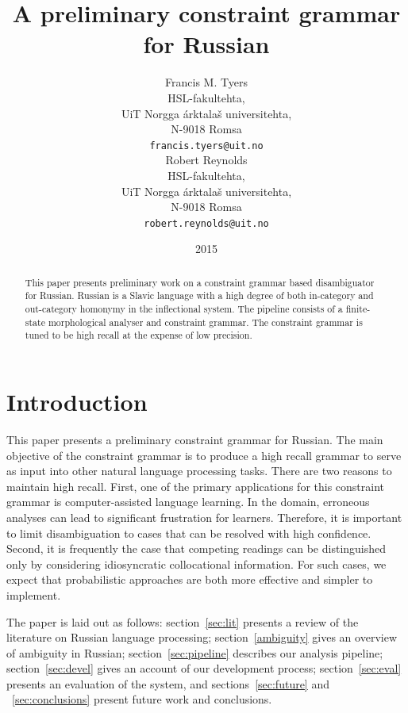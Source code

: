 \documentclass[11pt]{article}
\title{A preliminary constraint grammar for Russian}
\author{Francis M. Tyers \\
  HSL-fakultehta, \\
  UiT Norgga árktalaš universitehta, \\
  N-9018 Romsa \\
  {\tt francis.tyers@uit.no} \\\And
  Robert Reynolds \\
  HSL-fakultehta, \\
  UiT Norgga árktalaš universitehta, \\
  N-9018 Romsa \\
  {\tt robert.reynolds@uit.no} \\}
\date{2015}
\newcommand{\rr}[1]{\marginpar{\scriptsize R: #1}} %
\begin{document}
\maketitle
\begin{abstract}
 This paper presents preliminary work on a constraint
 grammar based disambiguator for Russian. Russian is
 a Slavic language with a high degree of both in-category
 and out-category homonymy in the inflectional system.
 The pipeline consists of a finite-state morphological
 analyser and constraint grammar. The constraint 
 grammar is tuned to be high recall at the expense of 
 low precision.
 \rr{add results here}
\end{abstract}

\section{Introduction}

This paper presents a preliminary constraint grammar for Russian. The main 
objective of the constraint grammar is to produce a high recall grammar to serve
as input into other natural language processing tasks. There are two reasons to
maintain high recall. First, one of the primary applications for this constraint grammar
is computer-assisted language learning. In the domain, erroneous analyses can lead to
significant frustration for learners. Therefore, it is important to limit disambiguation
to cases that can be resolved with high confidence.
Second, it is frequently the case that competing readings can
be distinguished only by considering idiosyncratic collocational information. For such cases, 
we expect that probabilistic approaches are both more effective and simpler to implement.

The paper is laid out as follows: section~\ref{sec:lit} presents a review of 
the literature on Russian language processing; section~\ref{ambiguity} gives
an overview of ambiguity in Russian; section~\ref{sec:pipeline} describes
our analysis pipeline; section~\ref{sec:devel} gives an account of our 
development process; section~\ref{sec:eval} presents an evaluation of the 
system, and sections~\ref{sec:future} and ~\ref{sec:conclusions} present future
work and conclusions.



\end{document}
